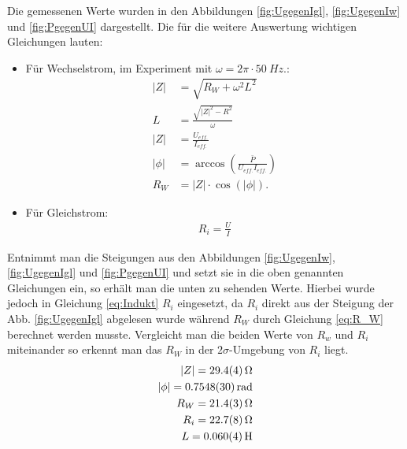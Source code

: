 Die gemessenen Werte wurden in den Abbildungen \ref{fig:UgegenIgl},  \ref{fig:UgegenIw} und \ref{fig:PgegenUI} dargestellt.
Die für die weitere Auswertung wichtigen Gleichungen lauten:
\begin{itemize}
 \item Für Wechselstrom, im Experiment mit $\omega=2\pi \cdot \SI{50}{Hz}.$:
\begin{align}
	|Z|&=\sqrt{R_W + \omega^2L^2}\\
	L&=\frac{\sqrt{|Z|^2-R^2}}{\omega}\\
	\label{eq:Indukt}
	|Z|&=\frac{U_{eff.}}{I_{eff.}}\\
	|\phi| &=\arccos\left(\frac{\bar{P}}{U_{eff.}I_{eff.}}\right)\\
	R_W&=|Z|\cdot \cos(|\phi|)	\label{eq:R_W}.
\end{align}
\item Für Gleichstrom:
\begin{align}
	R_i=\frac{U}{I}
\end{align}
\end{itemize}
Entnimmt man die Steigungen aus den Abbildungen \ref{fig:UgegenIw}, \ref{fig:UgegenIgl} und \ref{fig:PgegenUI} und setzt sie in die oben genannten Gleichungen ein, so erhält man die unten zu sehenden Werte. Hierbei wurde jedoch in Gleichung \ref{eq:Indukt} $R_i$ eingesetzt, da $R_i$ direkt aus der Steigung der Abb. \ref{fig:UgegenIgl} abgelesen wurde während $R_W$ durch Gleichung \ref{eq:R_W} berechnet werden musste. Vergleicht man die beiden Werte von $R_w$ und $R_i$ miteinander so erkennt man das  $R_W$ in der $2\sigma$-Umgebung von $R_i$ liegt. 
\begin{align}
	|Z|=\SI{29,4+-0,4}{\ohm}\\
	|\phi|=\SI{0,7548+-0,003}{rad}\\
	R_W=\SI{21,4+-0,3}{\ohm}\\
	R_i=\SI{22,7+-0,8}{\ohm}\\
	L=\SI{0,060+-0,004}{H}
\end{align}
